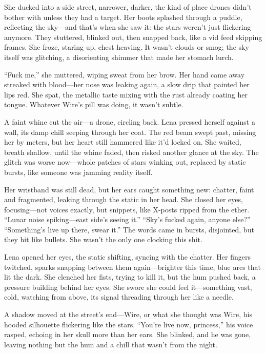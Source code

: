 \documentclass[12pt]{book}
\begin{document}
She ducked into a side street, narrower, darker, the kind of place drones didn’t bother with unless they had a target. Her boots splashed through a puddle, reflecting the sky---and that’s when she saw it: the stars weren’t just flickering anymore. They stuttered, blinked out, then snapped back, like a vid feed skipping frames. She froze, staring up, chest heaving. It wasn’t clouds or smog; the sky itself was glitching, a disorienting shimmer that made her stomach lurch.

``Fuck me,'' she muttered, wiping sweat from her brow. Her hand came away streaked with blood---her nose was leaking again, a slow drip that painted her lips red. She spat, the metallic taste mixing with the rust already coating her tongue. Whatever Wire’s pill was doing, it wasn’t subtle.

A faint whine cut the air---a drone, circling back. Lena pressed herself against a wall, its damp chill seeping through her coat. The red beam swept past, missing her by meters, but her heart still hammered like it’d locked on. She waited, breath shallow, until the whine faded, then risked another glance at the sky. The glitch was worse now---whole patches of stars winking out, replaced by static bursts, like someone was jamming reality itself.

Her wristband was still dead, but her ears caught something new: chatter, faint and fragmented, leaking through the static in her head. She closed her eyes, focusing---not voices exactly, but snippets, like X-posts ripped from the ether. ``Lunar noise spiking---east side’s seeing it.'' ``Sky’s fucked again, anyone else?'' ``Something’s live up there, swear it.'' The words came in bursts, disjointed, but they hit like bullets. She wasn’t the only one clocking this shit.

Lena opened her eyes, the static shifting, syncing with the chatter. Her fingers twitched, sparks snapping between them again---brighter this time, blue arcs that lit the dark. She clenched her fists, trying to kill it, but the hum pushed back, a pressure building behind her eyes. She swore she could feel it---something vast, cold, watching from above, its signal threading through her like a needle.

A shadow moved at the street’s end---Wire, or what she thought was Wire, his hooded silhouette flickering like the stars. ``You're live now, princess,'' his voice rasped, echoing in her skull more than her ears. She blinked, and he was gone, leaving nothing but the hum and a chill that wasn’t from the night.
\end{document}

